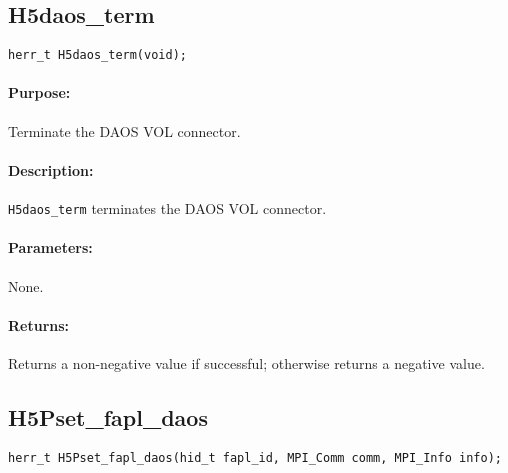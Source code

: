 \newpage
\subsection{H5daos\_term}
\label{ref:h5daos_term}

\begin{verbatim}
herr_t H5daos_term(void);
\end{verbatim}

\paragraph{Purpose:}
\begin{flushleft}%
Terminate the DAOS VOL connector.
\end{flushleft}%

\paragraph{Description:}
\begin{flushleft}%
\texttt{H5daos\_term} terminates the DAOS VOL connector.
\end{flushleft}%

\paragraph{Parameters:}
\begin{flushleft}%
None.
\end{flushleft}%

\paragraph{Returns:}
\begin{flushleft}%
Returns a non-negative value if successful; otherwise returns a negative value.
\end{flushleft}%

\newpage
\subsection{H5Pset\_fapl\_daos}
\label{ref:h5pset_fapl_daos}

\begin{verbatim}
herr_t H5Pset_fapl_daos(hid_t fapl_id, MPI_Comm comm, MPI_Info info);
\end{verbatim}

